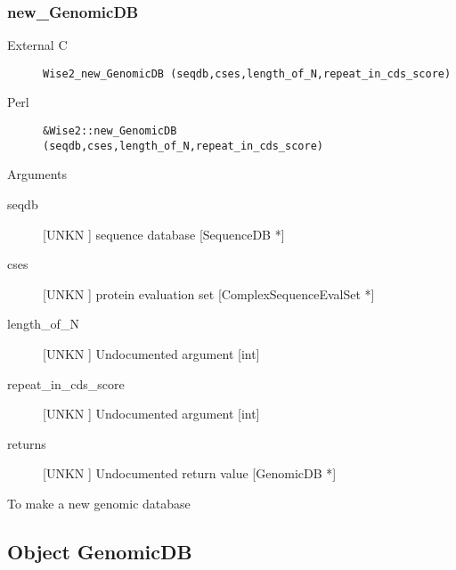 \subsubsection{new_GenomicDB}
\begin{description}
\item[External C] {\tt Wise2_new_GenomicDB (seqdb,cses,length_of_N,repeat_in_cds_score)}
\item[Perl] {\tt &Wise2::new_GenomicDB (seqdb,cses,length_of_N,repeat_in_cds_score)}

\end{description}
Arguments
\begin{description}
\item[seqdb] [UNKN ] sequence database [SequenceDB *]
\item[cses] [UNKN ] protein evaluation set [ComplexSequenceEvalSet *]
\item[length_of_N] [UNKN ] Undocumented argument [int]
\item[repeat_in_cds_score] [UNKN ] Undocumented argument [int]
\item[returns] [UNKN ] Undocumented return value [GenomicDB *]
\end{description}
To make a new genomic database




\subsection{Object GenomicDB}

\label{object_GenomicDB}

